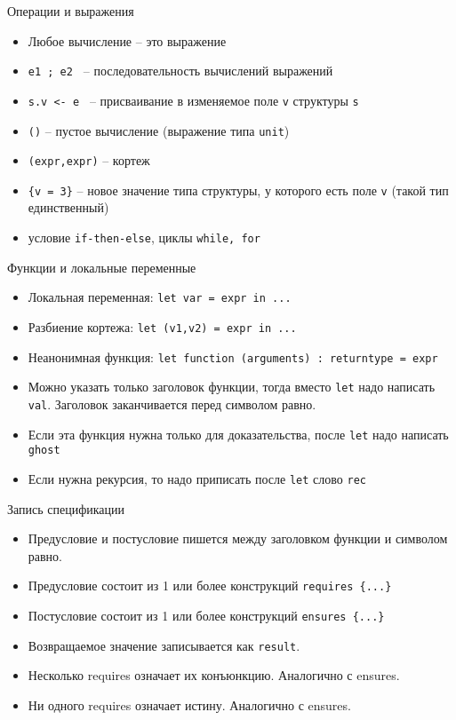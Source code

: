 \documentclass[hyperref={unicode=true}]{beamer}
\begin{document}
    \begin{frame}{Операции и выражения}
    \begin{itemize}
    \item
    Любое вычисление -- это выражение
    \item
    \texttt{e1 ; e2 } -- последовательность вычислений выражений
    \item
    \texttt{s.v <- e } -- присваивание в изменяемое поле
    \texttt{v} структуры \texttt{s}
    \item
    \texttt{()} -- пустое вычисление (выражение типа \texttt{unit})
    \item
    \texttt{(expr,expr)} -- кортеж
    \item
    \texttt{\{v = 3\}} -- новое значение типа структуры, у которого
    есть поле \texttt{v} (такой тип единственный)
    \item
    условие \texttt{if-then-else}, циклы \texttt{while, for}
    \end{itemize}
    \end{frame}

    \begin{frame}{Функции и локальные переменные}
    \begin{itemize}
    \item
    Локальная переменная: \texttt{let var = expr in ... }
    \item
    Разбиение кортежа: \texttt{let (v1,v2) = expr in ... }
    \item
    Неанонимная функция:
    \texttt{let function (arguments) : returntype = expr}
    \item
    Можно указать только заголовок функции, тогда вместо \texttt{let}
    надо написать \texttt{val}. Заголовок заканчивается перед
    символом равно.
    \item
    Если эта функция нужна только для доказательства, после \texttt{let}
    надо написать \texttt{ghost}
    \item
    Если нужна рекурсия, то надо приписать после \texttt{let}
    слово \texttt{rec}
    \end{itemize}
    \end{frame}

    \begin{frame}{Запись спецификации}
    \begin{itemize}
    \item
    Предусловие и постусловие пишется
    между заголовком функции и символом равно.
    \item
    Предусловие состоит из 1 или более
    конструкций \texttt{requires \{...\} }
    \item
    Постусловие состоит из 1 или более
    конструкций \texttt{ensures \{...\} }
    \item
    Возвращаемое значение записывается как \texttt{result}.
    \item
    Несколько requires означает их конъюнкцию. Аналогично с ensures.
    \item
    Ни одного requires означает истину. Аналогично с ensures.
    \end{itemize}
    \end{frame}
\end{document}
